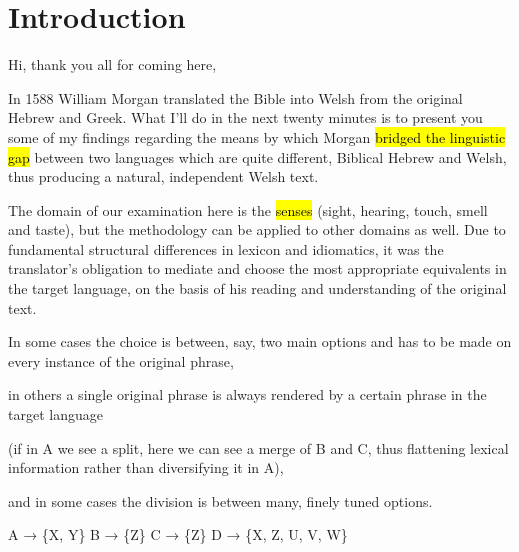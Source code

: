 \section{Introduction}

\begin{paper}
	{\click} Hi, thank you all for coming here,

	{\click} In 1588 William Morgan translated the Bible into Welsh from the original Hebrew and Greek. What I’ll do in the next twenty minutes is to present you some of my findings regarding the means by which Morgan \hl{bridged the linguistic gap} between two languages which are quite different, Biblical Hebrew and Welsh, thus producing a natural, independent Welsh text.

	The domain of our examination here is the \hl{senses} (sight, hearing, touch, smell and taste), but the methodology can be applied to other domains as well. Due to fundamental structural differences in lexicon and idiomatics, it was the translator’s obligation to mediate and choose the most appropriate equivalents in the target language, on the basis of his reading and understanding of the original text.

	\begin{compactitem}
		\item {\click}  In some cases the choice is between, say, two main options and has to be made on every instance of the original phrase,
		\item {} in others a single original phrase is always rendered by a certain phrase in the target language
			\begin{compactitem}
				\item (if in A we see a split, here we can see a merge of B and C, thus flattening lexical information rather than diversifying it in A),
			\end{compactitem}
		\item and in  some cases the division is between many, finely tuned options.
	\end{compactitem}
\end{paper}

\begin{hopoint}
	A → \{X, Y\}\hfill
	B → \{Z\}\hfill
	C → \{Z\}\hfill
	D → \{X, Z, U, V, W\}
\end{hopoint}

